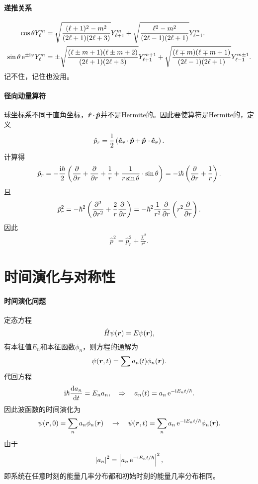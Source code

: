 \paragraph*{递推关系}
{\small\begin{align}\label{costhetaYlm}
	\cos\theta Y_\ell^m&=\sqrt{\frac{(\ell+1)^2-m^2}{(2\ell+1)(2\ell+3)}}Y_{\ell+1}^m+\sqrt{\frac{\ell^2-m^2}{(2\ell-1)(2\ell+1)}}Y_{\ell-1}^m.\\
	\sin\theta\mathop{}\!\mathrm{e}^{\pm\mathrm{i}\varphi}Y_\ell^m&=\pm\sqrt{\frac{(\ell\pm m+1)(\ell\pm m+2)}{(2\ell+1)(2\ell+3)}}Y_{\ell+1}^{m+1}+\sqrt{\frac{(\ell\mp m)(\ell\mp m+1)}{(2\ell-1)(2\ell+1)}}Y_{\ell-1}^{m\pm 1}.
\end{align}}
记不住，记住也没用。
\paragraph*{径向动量算符}球坐标系不同于直角坐标，$\bm{\hat r}\!\mathop{}\cdot\,\bm{\hat p}\!\mathop{}$并不是Hermite的。因此要使算符是Hermite的，定义
\[
	\hat p_r=\frac12\left(\bm{\hat e_r}\!\mathop{}\cdot\,\bm{\hat p}\!\mathop{}+\,\bm{\hat p}\!\mathop{}\,\cdot\,\bm{\hat e_r}\!\mathop{}\right).
\]
计算得
\begin{align}
	\hat p_r=-\frac{\i\hbar}2\kh{\pp r+\pp r+\frac1r+\frac1{r\sin\theta}\cdot\sin\theta}=-\i\hbar\kh{\pp r+\frac1r}.
\end{align}
且
\[
	\hat p_r^2=-\hbar^2\kh{\pp[2]r+\frac2r\pp r}=-\hbar^2\frac1{r^2}\pp r\kh{r^2\pp r}.
\]
因此
\begin{align}
	\hat p^2=\hat p_r^2+\frac{\hat L^2}{r^2}.
\end{align}
\clearpage
\section{时间演化与对称性}
\paragraph*{时间演化问题}
定态\Schr 方程
\[
	\hat H\psi(\bm r)=E\psi(\bm r),
\]
有本征值$E_n$和本征函数$\phi_n$，则\Schr 方程的通解为
\[
	\psi(\bm r,t)=\sum a_n(t)\phi_n(\bm r).
\]
代回\Schr 方程
\[
	\mathrm{i}\hbar\frac{\mathrm{d}^{\;\!\!}a_n}{\mathrm{d} t^{\;\!\!}}=E_na_n,\quad\Rightarrow\quad a_n(t)=a_n\mathop{}\!\mathrm{e}^{-\mathrm{i} E_nt/\hbar}.
\]
因此波函数的时间演化为
\[
	\psi(\bm r,0)=\sum_n a_n\phi_n(\bm r)\quad\to\quad\psi(\bm r,t)=\sum_n a_n\mathop{}\!\mathrm{e}^{-\mathrm{i} E_nt/\hbar}\phi_n(\bm r).
\]
由于
\[
	\left\lvert a_n\right\rvert^2=\left\lvert a_n\mathop{}\!\mathrm{e}^{-\mathrm{i} E_nt/\hbar}\right\rvert^2,
\]
即系统在任意时刻的能量几率分布都和初始时刻的能量几率分布相同。


